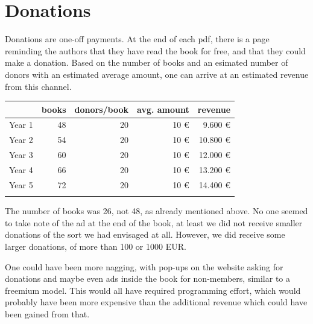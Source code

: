 \documentclass[output=guidelines,nonflat,smallfont,
draftmode
]{langsci/langscibook}
\newcommand{\background}[1]{ 
  \vspace{5mm}
  \renewcommand{\tblslinecolour}{lsDarkBlue}
  \tblssy[red]{explore2}{Background}{\vspace*{-5mm}#1}
}
\newcommand{\langscisolution}[1]{
  \renewcommand{\tblslinecolour}{lsLightBlue}
  \tblssy{langsci}{LangSci solution}{\vspace*{-5mm}#1}
}
\newcommand{\evaluation}[1]{
  \renewcommand{\tblslinecolour}{lsLightOrange}
  \tblssy{receipt}{Evaluation}{\vspace*{-5mm}#1}
}
\newcommand{\othersolutions}[1]{
  \renewcommand{\tblslinecolour}{lsDarkGreenOne}
  \tblssy{more}{Other solutions}{\vspace*{-5mm}#1}
}
\renewcommand{\tblssy}[4][black!12]{%
  \renewcommand{\langscisymbol}{#2}\renewcommand{\tblsboxcolor}{#1}
  \begin{mdframed}[style=yellowexercise,frametitle={#3}]
    #4
  \end{mdframed}
}
\begin{document}
\section{Donations} 
\background{Donations are one-off payments. At the end of each pdf, there is a page reminding the authors that they have read the book for free, and that they could make a donation. Based on the number of books and an esimated number of donors with an estimated average amount, one can arrive at an estimated revenue from this channel.}
\langscisolution{
\begin{tabularx}{\textwidth}{Xrrrr}
\lsptoprule 
          &   books   & donors/book &   avg. amount     &  revenue\\
\midrule  
Year 1   &   48      &            20      &            10 €     &                      9.600 €  \\
Year 2   &   54      &            20      &            10 €     &                      10.800 € \\
Year 3   &   60      &            20      &            10 €     &                      12.000 € \\
Year 4   &   66      &            20      &            10 €     &                      13.200 € \\
Year 5   &   72      &            20      &            10 €     &                      14.400 € \\
\lspbottomrule
\end{tabularx}
}
\evaluation{
The number of books was 26, not 48, as already mentioned above. No one seemed to take note of the ad at the end of the book, at least we did not receive smaller donations of the sort we had envisaged at all. However, we did receive some larger donations, of more than 100 or 1000 EUR. 
}
\othersolutions{One could have been more nagging, with pop-ups on the website asking for donations and maybe even ads inside the book for non-members, similar to a freemium model. This would all have required programming effort, which would probably have been more expensive than the additional revenue which could have been gained from that. }
\end{document}
